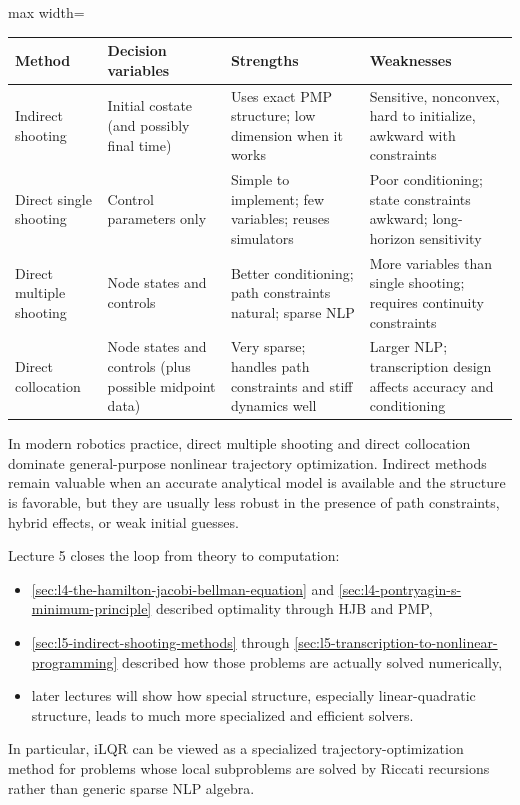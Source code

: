 \begin{center}
	\small
	\begin{adjustbox}{max width=\textwidth}
	\begin{tabular}{p{}p{}p{}p{}}
		\toprule
		Method & Decision variables & Strengths & Weaknesses \\
		\midrule
		Indirect shooting & Initial costate (and possibly final time) & Uses exact PMP structure; low dimension when it works & Sensitive, nonconvex, hard to initialize, awkward with constraints \\
		Direct single shooting & Control parameters only & Simple to implement; few variables; reuses simulators & Poor conditioning; state constraints awkward; long-horizon sensitivity \\
		Direct multiple shooting & Node states and controls & Better conditioning; path constraints natural; sparse NLP & More variables than single shooting; requires continuity constraints \\
		Direct collocation & Node states and controls (plus possible midpoint data) & Very sparse; handles path constraints and stiff dynamics well & Larger NLP; transcription design affects accuracy and conditioning \\
		\bottomrule
	\end{tabular}
	\end{adjustbox}
\end{center}

\begin{remark}
	In modern robotics practice, direct multiple shooting and direct collocation dominate general-purpose nonlinear trajectory optimization. Indirect methods remain valuable when an accurate analytical model is available and the structure is favorable, but they are usually less robust in the presence of path constraints, hybrid effects, or weak initial guesses.
\end{remark}

\begin{remark}
	Lecture 5 closes the loop from theory to computation:
	\begin{itemize}
		\item \autoref{sec:l4-the-hamilton-jacobi-bellman-equation} and \autoref{sec:l4-pontryagin-s-minimum-principle} described optimality through HJB and PMP,
		\item \autoref{sec:l5-indirect-shooting-methods} through \autoref{sec:l5-transcription-to-nonlinear-programming} described how those problems are actually solved numerically,
		\item later lectures will show how special structure, especially linear-quadratic structure, leads to much more specialized and efficient solvers.
	\end{itemize}
	In particular, iLQR can be viewed as a specialized trajectory-optimization method for problems whose local subproblems are solved by Riccati recursions rather than generic sparse NLP algebra.
\end{remark}
